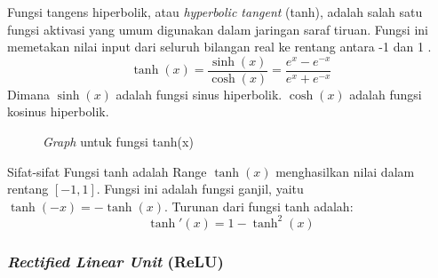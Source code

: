 Fungsi tangens hiperbolik, atau \textit{hyperbolic tangent} (tanh), adalah salah satu fungsi aktivasi yang umum digunakan dalam jaringan saraf tiruan. Fungsi ini memetakan nilai input dari seluruh bilangan real ke rentang antara -1 dan 1 \cite{Kelleher2019-cj}.
\begin{equation}
    \tanh(x) = \frac{\sinh(x)}{\cosh(x)} = \frac{e^x - e^{-x}}{e^x + e^{-x}}
\end{equation}
Dimana \(\sinh(x)\) adalah fungsi sinus hiperbolik. \(\cosh(x)\) adalah fungsi kosinus hiperbolik.

\begin{figure}[H]
    \centering
    \caption{\textit{Graph} untuk fungsi tanh(x)}
    \label{fig:tanh}
\end{figure}

Sifat-sifat Fungsi tanh adalah Range \(\tanh(x)\) menghasilkan nilai dalam rentang \([-1, 1]\). Fungsi ini adalah fungsi ganjil, yaitu \(\tanh(-x) = -\tanh(x)\). Turunan dari fungsi tanh adalah:
\begin{equation}
    \tanh'(x) = 1 - \tanh^2(x)
\end{equation}


\subsubsection{\textit{Rectified Linear Unit} (ReLU)}

